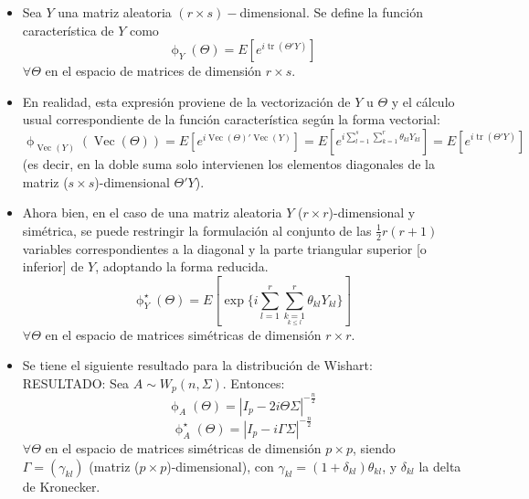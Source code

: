 \documentclass[11pt,a4paper]{article}
\begin{document}
\begin{itemize}
\item Sea $Y$ una matriz aleatoria $(r \times s)-$dimensional. Se define la función característica de $Y$ como
$$\upphi_{Y}(\Theta) = E[e^{i\operatorname{tr}(\Theta'Y)}]$$
$\forall \Theta$ en el espacio de matrices de dimensión $r \times s$.

\item En realidad, esta expresión proviene de la vectorización de $Y$ u $\Theta$ y el cálculo usual correspondiente de la función característica según la forma vectorial:
$$\upphi_{\operatorname{Vec}(Y)}(\operatorname{Vec}(\Theta)) = E[e^{i\operatorname{Vec}(\Theta)'\operatorname{Vec}(Y)}] = E[e^{i\sum_{l=1}^{s}\sum_{k=1}^{r}\theta_{kl}Y_{kl}}] = E[e^{i\operatorname{tr}(\Theta'Y)}]$$
(es decir, en la doble suma solo intervienen los elementos diagonales de la matriz ($s \times s$)-dimensional $\Theta'Y$).

\item Ahora bien, en el caso de una matriz aleatoria $Y$ ($r \times r$)-dimensional y simétrica, se puede restringir la formulación al conjunto de las $\frac{1}{2}r(r+1)$ variables correspondientes a la diagonal y la parte triangular superior [o inferior] de $Y$, adoptando la forma reducida.
$$\upphi_{Y}^{\star}(\Theta) = E[\exp\{i\sum_{l=1}^{r}\sum_{\underset{k \leq l}{k=1}}^{r}\theta_{kl}Y_{kl}\}]$$
$\forall \Theta$ en el espacio de matrices simétricas de dimensión $r \times r$.

\item Se tiene el siguiente resultado para la distribución de Wishart: \\
RESULTADO: Sea $A \sim W_{p}(n, \Sigma)$. Entonces:
$$\upphi_{A}(\Theta) = |I_{p} - 2i\Theta\Sigma|^{-\frac{n}{2}}$$
$$\upphi_{A}^{\star}(\Theta) = |I_{p} - i\Gamma\Sigma|^{-\frac{n}{2}}$$
$\forall \Theta$ en el espacio de matrices simétricas de dimensión $p \times p$, siendo $\Gamma = (\gamma_{kl})$ (matriz ($p \times p$)-dimensional), con $\gamma_{kl} = (1 + \delta_{kl})\theta_{kl}$, y $\delta_{kl}$ la delta de Kronecker.
\end{itemize}
\end{document}
